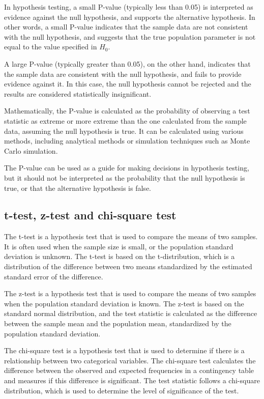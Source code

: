 \documentclass[12pt, a4paper, oneside]{article}
\begin{document}
In hypothesis testing, a small P-value (typically less than 0.05) is interpreted as evidence against the null hypothesis, and supports the alternative hypothesis. In other words, a small P-value indicates that the sample data are not consistent with the null hypothesis, and suggests that the true population parameter is not equal to the value specified in $H_0$.

A large P-value (typically greater than 0.05), on the other hand, indicates that the sample data are consistent with the null hypothesis, and fails to provide evidence against it. In this case, the null hypothesis cannot be rejected and the results are considered statistically insignificant.

Mathematically, the P-value is calculated as the probability of observing a test statistic as extreme or more extreme than the one calculated from the sample data, assuming the null hypothesis is true. It can be calculated using various methods, including analytical methods or simulation techniques such as Monte Carlo simulation.

The P-value can be used as a guide for making decisions in hypothesis testing, but it should not be interpreted as the probability that the null hypothesis is true, or that the alternative hypothesis is false.
\subsection{ t-test, z-test and chi-square test }

The t-test is a hypothesis test that is used to compare the means of two samples. It is often used when the sample size is small, or the population standard deviation is unknown. The t-test is based on the t-distribution, which is a distribution of the difference between two means standardized by the estimated standard error of the difference.

The z-test is a hypothesis test that is used to compare the means of two samples when the population standard deviation is known. The z-test is based on the standard normal distribution, and the test statistic is calculated as the difference between the sample mean and the population mean, standardized by the population standard deviation.

The chi-square test is a hypothesis test that is used to determine if there is a relationship between two categorical variables. The chi-square test calculates the difference between the observed and expected frequencies in a contingency table and measures if this difference is significant. The test statistic follows a chi-square distribution, which is used to determine the level of significance of the test.
\end{document}
